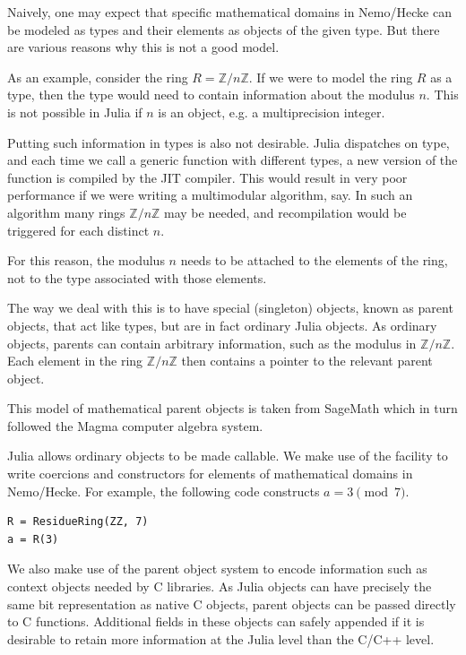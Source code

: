 \documentclass{sig-alternate-05-2015}
\begin{document}
Naively, one may expect that specific mathematical domains in Nemo/Hecke can be modeled as types
and their elements as objects of the given type. But there are various reasons why this is not a
good model.

As an example, consider the ring $R = \mathbb{Z}/n\mathbb{Z}$. If we were to model the ring $R$
as a type, then the type would need to contain information about the modulus $n$. This is not
possible in Julia if $n$ is an object, e.g. a multiprecision integer.

Putting such information in types is also not desirable. Julia dispatches on type, and each time
we call a generic function with different types, a new version of the function is compiled by the
JIT compiler. This would result in very poor performance if we were writing a multimodular
algorithm, say. In such an algorithm many rings $\mathbb{Z}/n\mathbb{Z}$ may be needed, and
recompilation would be triggered for each distinct $n$.

For this reason, the modulus $n$ needs to be attached to the elements of the ring, not to the type
associated with those elements.

The way we deal with this is to have special (singleton) objects, known as parent objects, that act
like types, but are in fact ordinary Julia objects. As ordinary objects, parents can contain
arbitrary information, such as the modulus in $\mathbb{Z}/n\mathbb{Z}$. Each element in the ring
$\mathbb{Z}/n\mathbb{Z}$ then contains a pointer to the relevant parent object.

This model of mathematical parent objects is taken from SageMath which in turn followed the Magma
computer algebra system.

Julia allows ordinary objects to be made callable. We make use of the facility to write coercions
and constructors for elements of mathematical domains in Nemo/Hecke. For example, the following
code constructs $a = 3 \pmod{7}$.

\begin{verbatim}
R = ResidueRing(ZZ, 7)
a = R(3)
\end{verbatim}

We also make use of the parent object system to encode information such as context objects needed
by C libraries. As Julia objects can have precisely the same bit representation as native C objects,
parent objects can be passed directly to C functions. Additional fields in these objects can safely
appended if it is desirable to retain more information at the Julia level than the C/C++ level. 
\end{document}
